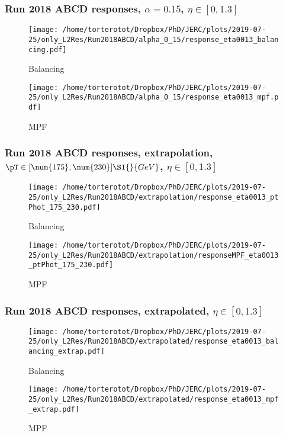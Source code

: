 \begin{frame}
\frametitle{Run 2018 ABCD responses, $\alpha=\num{0.15}$, $\eta\in [\num{0},\num{1.3}]$}
\begin{minipage}{.45\textwidth}
\begin{figure}
\texttt{[image: /home/torterotot/Dropbox/PhD/JERC/plots/2019-07-25/only\_L2Res/Run2018ABCD/alpha\_0\_15/response\_eta0013\_balancing.pdf]}
\caption{Balancing}
\end{figure}
\end{minipage}
\hfill
\begin{minipage}{.45\textwidth}
\begin{figure}
\texttt{[image: /home/torterotot/Dropbox/PhD/JERC/plots/2019-07-25/only\_L2Res/Run2018ABCD/alpha\_0\_15/response\_eta0013\_mpf.pdf]}
\caption{MPF}
\end{figure}
\end{minipage}
\end{frame}

\begin{frame}
\frametitle{Run 2018 ABCD responses, extrapolation, $\pT\in [\num{175},\num{230}]\SI{}{GeV}$, $\eta\in [\num{0},\num{1.3}]$}
\begin{minipage}{.45\textwidth}
\begin{figure}
\texttt{[image: /home/torterotot/Dropbox/PhD/JERC/plots/2019-07-25/only\_L2Res/Run2018ABCD/extrapolation/response\_eta0013\_ptPhot\_175\_230.pdf]}
\caption{Balancing}
\end{figure}
\end{minipage}
\hfill
\begin{minipage}{.45\textwidth}
\begin{figure}
\texttt{[image: /home/torterotot/Dropbox/PhD/JERC/plots/2019-07-25/only\_L2Res/Run2018ABCD/extrapolation/responseMPF\_eta0013\_ptPhot\_175\_230.pdf]}
\caption{MPF}
\end{figure}
\end{minipage}
\end{frame}

\begin{frame}
\frametitle{Run 2018 ABCD responses, extrapolated, $\eta\in [\num{0},\num{1.3}]$}
\begin{minipage}{.45\textwidth}
\begin{figure}
\texttt{[image: /home/torterotot/Dropbox/PhD/JERC/plots/2019-07-25/only\_L2Res/Run2018ABCD/extrapolated/response\_eta0013\_balancing\_extrap.pdf]}
\caption{Balancing}
\end{figure}
\end{minipage}
\hfill
\begin{minipage}{.45\textwidth}
\begin{figure}
\texttt{[image: /home/torterotot/Dropbox/PhD/JERC/plots/2019-07-25/only\_L2Res/Run2018ABCD/extrapolated/response\_eta0013\_mpf\_extrap.pdf]}
\caption{MPF}
\end{figure}
\end{minipage}
\end{frame}